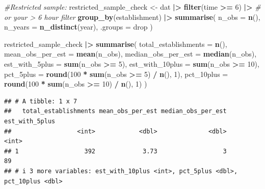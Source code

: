 \documentclass[
]{article}
\newenvironment{Shaded}{\begin{snugshade}}{\end{snugshade}}
\newcommand{\AttributeTok}[1]{\textcolor[rgb]{0.13,0.29,0.53}{#1}}
\newcommand{\CommentTok}[1]{\textcolor[rgb]{0.56,0.35,0.01}{\textit{#1}}}
\newcommand{\DecValTok}[1]{\textcolor[rgb]{0.00,0.00,0.81}{#1}}
\newcommand{\FunctionTok}[1]{\textcolor[rgb]{0.13,0.29,0.53}{\textbf{#1}}}
\newcommand{\NormalTok}[1]{#1}
\newcommand{\OtherTok}[1]{\textcolor[rgb]{0.56,0.35,0.01}{#1}}
\newcommand{\SpecialCharTok}[1]{\textcolor[rgb]{0.81,0.36,0.00}{\textbf{#1}}}
\newcommand{\StringTok}[1]{\textcolor[rgb]{0.31,0.60,0.02}{#1}}
\begin{document}
\begin{Shaded}
\begin{Highlighting}[]
\CommentTok{\#Restricted sample: }
\NormalTok{restricted\_sample\_check }\OtherTok{\textless{}{-}}\NormalTok{ dat }\SpecialCharTok{|\textgreater{}}
  \FunctionTok{filter}\NormalTok{(time }\SpecialCharTok{\textgreater{}=} \DecValTok{6}\NormalTok{) }\SpecialCharTok{|\textgreater{}}  \CommentTok{\# or your \textgreater{} 6 hour filter}
  \FunctionTok{group\_by}\NormalTok{(establishment) }\SpecialCharTok{|\textgreater{}}
  \FunctionTok{summarise}\NormalTok{(}
    \AttributeTok{n\_obs =} \FunctionTok{n}\NormalTok{(),}
    \AttributeTok{n\_years =} \FunctionTok{n\_distinct}\NormalTok{(year),}
    \AttributeTok{.groups =} \StringTok{\textquotesingle{}drop\textquotesingle{}}
\NormalTok{  )}

\NormalTok{restricted\_sample\_check }\SpecialCharTok{|\textgreater{}}
  \FunctionTok{summarise}\NormalTok{(}
    \AttributeTok{total\_establishments =} \FunctionTok{n}\NormalTok{(),}
    \AttributeTok{mean\_obs\_per\_est =} \FunctionTok{mean}\NormalTok{(n\_obs),}
    \AttributeTok{median\_obs\_per\_est =} \FunctionTok{median}\NormalTok{(n\_obs),}
    \AttributeTok{est\_with\_5plus =} \FunctionTok{sum}\NormalTok{(n\_obs }\SpecialCharTok{\textgreater{}=} \DecValTok{5}\NormalTok{),}
    \AttributeTok{est\_with\_10plus =} \FunctionTok{sum}\NormalTok{(n\_obs }\SpecialCharTok{\textgreater{}=} \DecValTok{10}\NormalTok{),}
    \AttributeTok{pct\_5plus =} \FunctionTok{round}\NormalTok{(}\DecValTok{100} \SpecialCharTok{*} \FunctionTok{sum}\NormalTok{(n\_obs }\SpecialCharTok{\textgreater{}=} \DecValTok{5}\NormalTok{) }\SpecialCharTok{/} \FunctionTok{n}\NormalTok{(), }\DecValTok{1}\NormalTok{),}
    \AttributeTok{pct\_10plus =} \FunctionTok{round}\NormalTok{(}\DecValTok{100} \SpecialCharTok{*} \FunctionTok{sum}\NormalTok{(n\_obs }\SpecialCharTok{\textgreater{}=} \DecValTok{10}\NormalTok{) }\SpecialCharTok{/} \FunctionTok{n}\NormalTok{(), }\DecValTok{1}\NormalTok{)}
\NormalTok{  ) }
\end{Highlighting}
\end{Shaded}

\begin{verbatim}
## # A tibble: 1 x 7
##   total_establishments mean_obs_per_est median_obs_per_est est_with_5plus
##                  <int>            <dbl>              <dbl>          <int>
## 1                  392             3.73                  3             89
## # i 3 more variables: est_with_10plus <int>, pct_5plus <dbl>, pct_10plus <dbl>
\end{verbatim}
\end{document}
